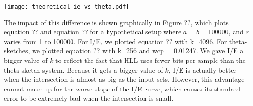 \documentclass{sig-alternate}
\begin{document}
\begin{center}
\texttt{[image: theoretical-ie-vs-theta.pdf]}
\end{center}

The impact of
this difference is shown graphically in Figure ??, which plots
equation ?? and equation ?? for a hypothetical setup where
$a=b=100000$, and $r$ varies from 1 to 100000. For I/E, we plotted
equation ?? with k=4096. For theta-sketches, we plotted equation ?? 
with k=256 and wcp = 0.01247. We gave I/E a bigger value of $k$
to reflect the fact that HLL uses fewer bits per sample than the theta-sketch system.
Because it gets a bigger value of $k$, I/E is actually better when
the intersection is almost as big as the input sets. However, this advantage
cannot make up for the worse slope of the I/E curve, which causes its standard
error to be extremely bad when the intersection is small.
\end{document}
